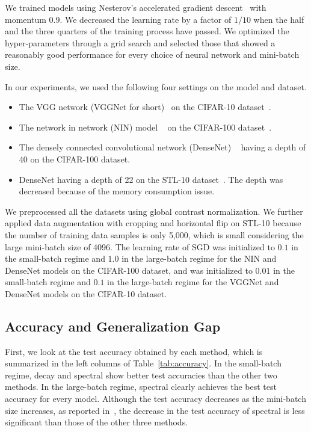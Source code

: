 We trained models using Nesterov's accelerated gradient descent~\cite{Bengio:2013fn} with momentum 0.9. We decreased the learning rate by a factor of $1/10$ when the half and the three quarters of the training process have passed. We optimized the hyper-parameters through a grid search and selected those that showed a reasonably good performance for every choice of neural network and mini-batch size.

In our experiments, we used the following four settings on the model and dataset.

\begin{itemize}
\itemsep=0pt
\item The VGG network (VGGNet for short)~\cite{Simonyan:2014ws} on the CIFAR-10 dataset~\cite{Krizhevsky:2009tr}.
\item The network in network (NIN) model ~\cite{Lin:2014wb} on the CIFAR-100 dataset~\cite{Krizhevsky:2009tr}.
\item The densely connected convolutional network (DenseNet) ~\cite{Huang:2016wa} having a depth of 40 on the CIFAR-100 dataset.
\item DenseNet having a depth of 22 on the STL-10 dataset~\cite{Coates:2011wo}. The depth was decreased because of the memory consumption issue.
\end{itemize}

We preprocessed all the datasets using global contrast normalization. We further applied data augmentation with cropping and horizontal flip on STL-10 because the number of training data samples is only 5,000, which is small considering the large mini-batch size of 4096. The learning rate of SGD was initialized to $0.1$ in the small-batch regime and $1.0$ in the large-batch regime for the NIN and DenseNet models on the CIFAR-100 dataset, and was initialized to $0.01$ in the small-batch regime and $0.1$ in the large-batch regime for the VGGNet and DenseNet models on the CIFAR-10 dataset.

\subsection{Accuracy and Generalization Gap}\label{subsec:accuracy}

First, we look at the test accuracy obtained by each method, which is summarized in the left columns of Table~\ref{tab:accuracy}.
In the small-batch regime, \textsf{decay} and \textsf{spectral} show better test accuracies than the other two methods. In the large-batch regime, \textsf{spectral} clearly achieves the best test accuracy for every model. Although the test accuracy decreases as the mini-batch size increases, as reported in~\cite{Keskar:2017tz}, the decrease in the test accuracy of \textsf{spectral} is less significant than those of the other three methods.

